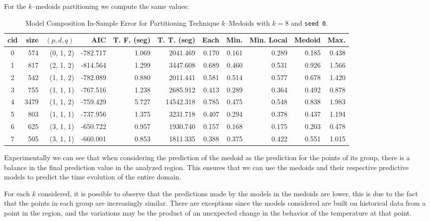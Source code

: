 For the $k$--medoids partitioning we compute the same values:
\begin{table}[h]
	\centering
	\tiny
	\begin{tabular}{|c|r|r|r|r|r|r|r|r|r|r|}
		\hline
		cid & size & $(p, d, q)$ & AIC & T. F. (seg) & T. T. (seg) & Each & Min. & Min. Local & Medoid & Max. \\
		\hline
		0 &  574 & (0, 1, 2) & -782.717 & 1.069	&  2041.469	& 0.170	& 0.161	& 0.289	& 0.185	& 0.438	 \\
		1 &  817 & (2, 1, 2) & -814.564 & 1.299	&  3447.608	& 0.689	& 0.460	& 0.531	& 0.926	& 1.566	 \\
		2 &  542 & (1, 1, 2) & -782.089 & 0.880	&  2011.441	& 0.581	& 0.514	& 0.577	& 0.678	& 1.420	 \\
		3 &  755 & (1, 1, 1) & -767.516 & 1.238	&  2685.912	& 0.413	& 0.289	& 0.364	& 0.492	& 0.878	 \\
		4 & 3479 & (1, 1, 2) & -759.429 & 5.727	& 14542.318	& 0.785	& 0.475	& 0.548	& 0.838	& 1.983	 \\
		5 &  803 & (1, 1, 1) & -737.956 & 1.375	&  3231.718	& 0.407	& 0.294	& 0.378	& 0.437	& 1.194	 \\
		6 &  625 & (3, 1, 1) & -650.722 & 0.957	&  1930.740	& 0.157	& 0.168	& 0.175	& 0.203	& 0.478	 \\
		7 &  505 & (3, 1, 1) & -660.001 & 0.853	&  1811.335	& 0.388	& 0.375	& 0.422	& 0.551	& 1.015	 \\ \hline	
	\end{tabular}
	\caption{Model Composition In-Sample Error for Partitioning Technique  $k$--Medoids with $k=8$ and \texttt{seed 0}.}
	\label{Table:ForecastErrorkMedoidsk10}
\end{table}
Experimentally we can see that when considering the prediction of the medoid as the prediction for the points of its group, there is a balance in the final prediction value in the analyzed region. This ensures that we can use the medoids and their respective predictive models to predict the time evolution of the entire domain.

For each $k$ considered, it is possible to observe that the predictions made by the models in the medoids are lower, this is due to the fact that the points in each group are increasingly similar. There are exceptions since the models considered are built on historical data from a point in the region, and the variations may be the product of an unexpected change in the behavior of the temperature at that point.

